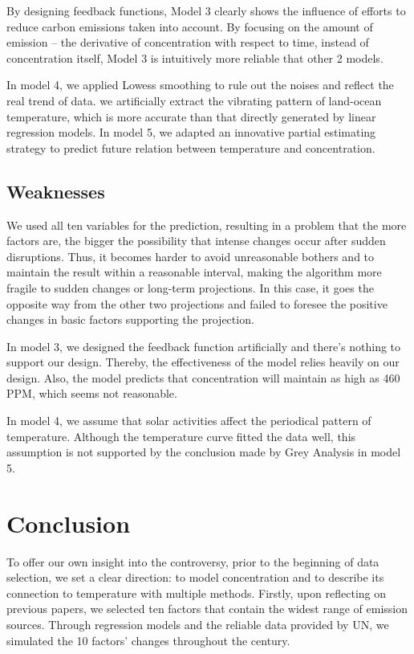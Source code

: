\documentclass[12pt]{article}
\begin{document}
By designing feedback functions, Model 3 clearly shows the influence of efforts to reduce carbon emissions taken into account. By focusing on the amount of  emission -- the derivative of  concentration with respect to time, instead of  concentration itself, Model 3 is intuitively more reliable that other 2 models.

In model 4, we applied Lowess smoothing to rule out the noises and reflect the real trend of data. we artificially extract the vibrating pattern of land-ocean temperature, which is more accurate than that directly generated by linear regression models. In model 5, we adapted an innovative partial estimating strategy to predict future relation between temperature and  concentration. 

\subsection*{Weaknesses}

We used all ten variables for the prediction, resulting in a problem that the more factors are, the bigger the possibility that intense changes occur after sudden disruptions. Thus, it becomes harder to avoid unreasonable bothers and to maintain the result within a reasonable interval, making the algorithm more fragile to sudden changes or long-term projections. In this case, it goes the opposite way from the other two projections and failed to foresee the positive changes in basic factors supporting the projection.

In model 3, we designed the feedback function artificially and there's nothing to support our design. Thereby, the effectiveness of the model relies heavily on our design. Also, the model predicts that  concentration will maintain as high as 460 PPM, which seems not reasonable.

In model 4, we assume that solar activities affect the periodical pattern of temperature. Although the temperature curve fitted the data well, this assumption is not supported by the conclusion made by Grey Analysis in model 5.

\section{Conclusion}

To offer our own insight into the controversy, prior to the beginning of data selection, we set a clear direction: to model  concentration and to describe its connection to temperature with multiple methods. Firstly, upon reflecting on previous papers, we selected ten factors that contain the widest range of emission sources. Through regression models and the reliable data provided by UN, we simulated the 10 factors' changes throughout the century. 
\end{document}
